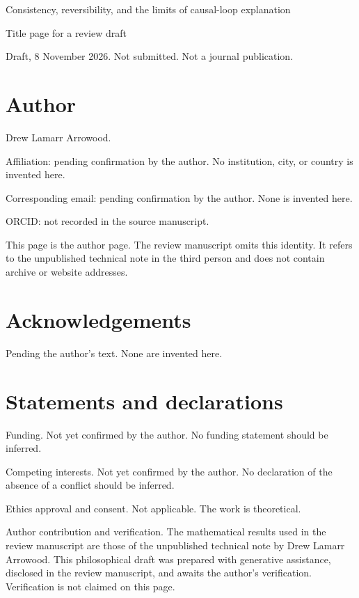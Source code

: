 \documentclass[11pt]{article}
\begin{document}
\begin{center}
{\Large Consistency, reversibility, and the limits of causal-loop explanation\par}
\vspace{1.5em}
{\large Title page for a review draft\par}
\vspace{0.4em}
Draft, 8 November 2026. Not submitted. Not a journal publication.\par
\end{center}

\section*{Author}
Drew Lamarr Arrowood.

Affiliation: pending confirmation by the author. No institution, city, or country is invented here.

Corresponding email: pending confirmation by the author. None is invented here.

ORCID: not recorded in the source manuscript.

This page is the author page. The review manuscript omits this identity. It refers to the unpublished technical note in the third person and does not contain archive or website addresses.

\section*{Acknowledgements}
Pending the author's text. None are invented here.

\section*{Statements and declarations}
Funding. Not yet confirmed by the author. No funding statement should be inferred.

Competing interests. Not yet confirmed by the author. No declaration of the absence of a conflict should be inferred.

Ethics approval and consent. Not applicable. The work is theoretical.

Author contribution and verification. The mathematical results used in the review manuscript are those of the unpublished technical note by Drew Lamarr Arrowood. This philosophical draft was prepared with generative assistance, disclosed in the review manuscript, and awaits the author's verification. Verification is not claimed on this page.
\end{document}
